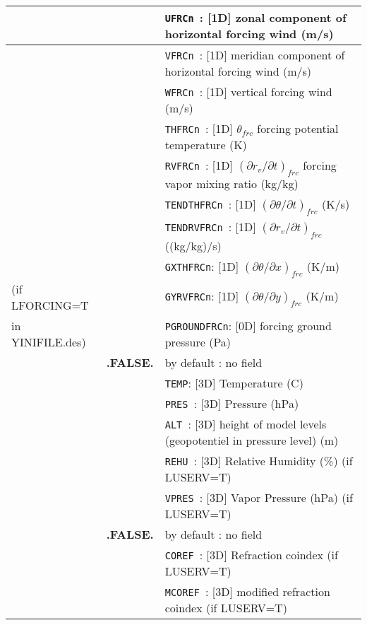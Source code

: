 \begin{center}
\begin{tabular}{|>{\centering}p{3cm}|>{\centering}p{2.5cm}|p{11cm}|}
&\multirow{10}{*}{.TRUE.} & {\tt UFRCn }: [1D]  zonal component of horizontal forcing wind (m/s)\\\cline{3-3}
& & {\tt VFRCn }: [1D]  meridian component of horizontal forcing wind (m/s)\\\cline{3-3}
& & {\tt WFRCn }: [1D] vertical forcing wind (m/s)\\\cline{3-3}
& & {\tt THFRCn }: [1D] $\theta_{frc}$ forcing potential temperature  (K)\\\cline{3-3}
& & {\tt RVFRCn }: [1D] $(\partial r_v/ \partial t)_{frc}$ forcing vapor mixing ratio (kg/kg)\\\cline{3-3}
& & {\tt TENDTHFRCn }: [1D] $(\partial\theta / \partial t)_{frc}$ (K/s)\\\cline{3-3}
& & {\tt TENDRVFRCn }: [1D] $(\partial r_v/ \partial t)_{frc}$ ((kg/kg)/s)\\\cline{3-3}
& & {\tt GXTHFRCn}: [1D] $(\partial\theta/ \partial x)_{frc}$ (K/m)\\\cline{3-3}
{\scriptsize (if LFORCING=T}& & {\tt GYRVFRCn}: [1D] $(\partial\theta/ \partial y)_{frc}$ (K/m)\\\cline{3-3}
{\scriptsize in YINIFILE.des)}& &{\tt PGROUNDFRCn}: [0D] forcing ground pressure (Pa) \\ \hline
\multirow{6}{*}{LTPZH}\index{LTPZH!\innam{NAM\_DIAG}}&\textbf{.FALSE.} & by default : no field\\\cline{2-3}
&\multirow{5}{*}{.TRUE.} &{\tt TEMP}: [3D] Temperature (C) \\\cline{3-3}
& &{\tt PRES }: [3D] Pressure (hPa)\\\cline{3-3}
& &{\tt ALT }: [3D] height of model levels (geopotentiel in pressure level) (m)\\\cline{3-3}
& &{\tt REHU }: [3D] Relative Humidity (\%) (if LUSERV=T) \\\cline{3-3}
& &{\tt VPRES }: [3D]  Vapor Pressure (hPa) (if LUSERV=T)\\ \hline
\multirow{3}{*}{LCOREF}\index{LCOREF!\innam{NAM\_DIAG}}&\textbf{.FALSE.} & by default : no field \\\cline{2-3}
&\multirow{2}{*}{.TRUE.} &{\tt COREF }: [3D] Refraction coindex (if LUSERV=T)\\\cline{3-3}
& &{\tt  MCOREF }: [3D] modified refraction coindex (if LUSERV=T)\\ \hline
\end{tabular}
\end{center}

